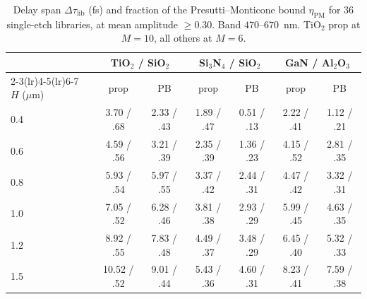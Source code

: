 \documentclass[preprint,12pt]{elsarticle}
\begin{document}
\begin{table}[t]
\centering
\caption{Delay span $\Delta\tau_\mathrm{lib}$ (fs) and fraction of the
Presutti--Monticone bound $\eta_\mathrm{PM}$ for 36 single-etch libraries, at mean
amplitude $\ge 0.30$. Band $470$--$670$~nm. TiO$_2$ prop at $M=10$, all others at
$M=6$.}
\label{tab:r1span}
\small
\setlength{\tabcolsep}{4pt}
\begin{tabular}{l cc cc cc}
\toprule
 & \multicolumn{2}{c}{TiO$_2$ / SiO$_2$} & \multicolumn{2}{c}{Si$_3$N$_4$ / SiO$_2$}
 & \multicolumn{2}{c}{GaN / Al$_2$O$_3$} \\
\cmidrule(lr){2-3}\cmidrule(lr){4-5}\cmidrule(lr){6-7}
$H$ ($\mu$m) & prop & PB & prop & PB & prop & PB \\
\midrule
0.4 & 3.70 / .68 & 2.33 / .43 & 1.89 / .47 & 0.51 / .13 & 2.22 / .41 & 1.12 / .21 \\
0.6 & 4.59 / .56 & 3.21 / .39 & 2.35 / .39 & 1.36 / .23 & 4.15 / .52 & 2.81 / .35 \\
0.8 & 5.93 / .54 & 5.97 / .55 & 3.37 / .42 & 2.44 / .31 & 4.47 / .42 & 3.32 / .31 \\
1.0 & 7.05 / .52 & 6.28 / .46 & 3.81 / .38 & 2.93 / .29 & 5.99 / .45 & 4.63 / .35 \\
1.2 & 8.92 / .55 & 7.83 / .48 & 4.49 / .37 & 3.48 / .29 & 6.45 / .40 & 5.32 / .33 \\
1.5 & 10.52 / .52 & 9.01 / .44 & 5.43 / .36 & 4.60 / .31 & 8.23 / .41 & 7.59 / .38 \\
\bottomrule
\end{tabular}
\end{table}
\end{document}

